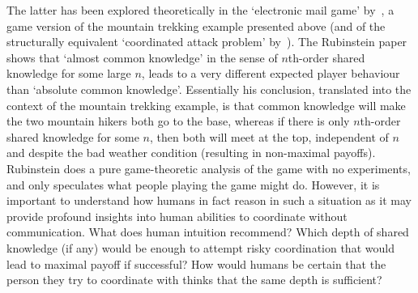 \documentclass[twocolumn,a4paper,superscriptaddress,nofootinbib]{revtex4}
\newenvironment{robin}{\smallskip \noindent \color{red!10!green!50!blue}}{\color{black}\smallskip}
\begin{document}
The latter has been explored theoretically in the  `electronic mail game' by~\citet{rubinstein1989electronic}, a game version of the mountain trekking example presented above (and of the structurally equivalent `coordinated attack problem' by~\citet{fagin1995reasoning}). The Rubinstein paper shows that `almost common knowledge' in the sense of $n$th-order shared knowledge for some large $n$, leads to a very different expected player behaviour than `absolute common knowledge'. Essentially his conclusion, translated into the context of the mountain trekking example, is that common knowledge will make the two mountain hikers both go to the base, whereas if there is only $n$th-order shared knowledge for some $n$, then both will meet at the top, independent of $n$ and despite the bad weather condition (resulting in non-maximal payoffs). Rubinstein does a pure game-theoretic analysis of the game with no experiments, and only speculates what people playing the game might do. \begin{robin}However, it is important to understand how humans in fact reason in such a situation as it may provide profound insights into human abilities to coordinate without communication.\end{robin} What does human intuition recommend? Which depth of shared knowledge (if any) would be enough to attempt risky coordination that would lead to maximal payoff if successful? How would humans be certain that the person they try to coordinate with thinks that the same depth is sufficient?
\end{document}

